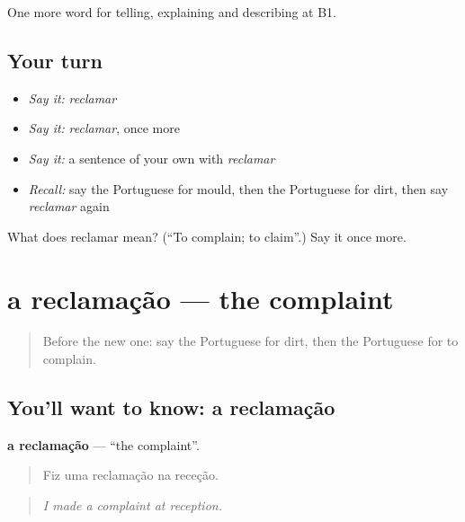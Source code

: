 \begin{grammarlens}[title={What you've built}]
One more word for telling, explaining and describing at B1.
\end{grammarlens}

\subsection*{Your turn}
\begin{itemize}
\raggedright
  \item \emph{Say it:} \emph{reclamar}
  \item \emph{Say it:} \emph{reclamar}, once more
  \item \emph{Say it:} a sentence of your own with \emph{reclamar}
  \item \emph{Recall:} say the Portuguese for mould, then the Portuguese for dirt, then say \emph{reclamar} again
\end{itemize}

\begin{tcolorbox}[breakable,colback=teal!4,colframe=teal!35!black,title={Before you move on}]
What does reclamar mean? (\textquotedblleft{}To complain; to claim\textquotedblright{}.) Say it once more.
\end{tcolorbox}
\section[a reclamação]{a reclamação — the complaint}

\label{lesson:PT-C434-reclamacao}



\begin{quote}
Before the new one: say the Portuguese for dirt, then the Portuguese for to complain.
\end{quote}

\subsection*{You'll want to know: a reclamação}
\textbf{a reclamação} — \textquotedblleft{}the complaint\textquotedblright{}.

\begin{quote}
Fiz uma reclamação na receção.
\end{quote}

\begin{quote}
\emph{I made a complaint at reception.}
\end{quote}

